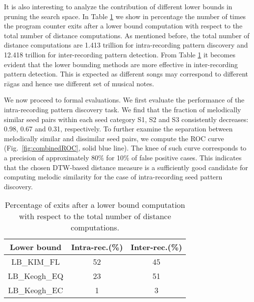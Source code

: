 It is also interesting to analyze the contribution of different lower bounds in pruning the search space. In Table \ref{tab:computationalStats} we show in percentage the number of times the program counter exits after a lower bound computation with respect to the total number of distance computations. As mentioned before, the total number of distance computations are 1.413 trillion for intra-recording pattern discovery and 12.418 trillion for inter-recording pattern detection. From Table \ref{tab:computationalStats} it becomes evident that the lower bounding methods are more effective in inter-recording pattern detection. This is expected as different songs may correspond to different r\={a}gas and hence use different set of musical notes.


We now proceed to formal evaluations. We first evaluate the performance of the intra-recording pattern discovery task. We find that the fraction of melodically similar seed pairs within each seed category S1, S2 and S3 consistently decreases: 0.98, 0.67 and 0.31, respectively. To further examine the separation between melodically similar and dissimilar seed pairs, we compute the ROC curve (Fig.~\ref{fig:combinedROC}, solid blue line). The knee of such curve corresponds to a precision of approximately 80\% for 10\% of false positive cases. This indicates that the chosen DTW-based distance measure is a sufficiently good candidate for computing melodic similarity for the case of intra-recording seed pattern discovery. 

\begin{table} 
	\centering
	\caption{Percentage of exits after a lower bound computation with respect to the total number of distance computations.}
	\label{tab:computationalStats}
	
	\begin{tabular}{ c | c c }
		
		\hline\hline
		Lower bound   	& Intra-rec.(\%)		&	Inter-rec.(\%) \\	
		
		\hline 
		LB\_KIM\_FL   	& 52	&	45 \\	
		LB\_Keogh\_EQ   	& 23	&	51 \\
		LB\_Keogh\_EC   		& 1	&	3 \\
		\hline\hline
		
	\end{tabular}
	
\end{table}




